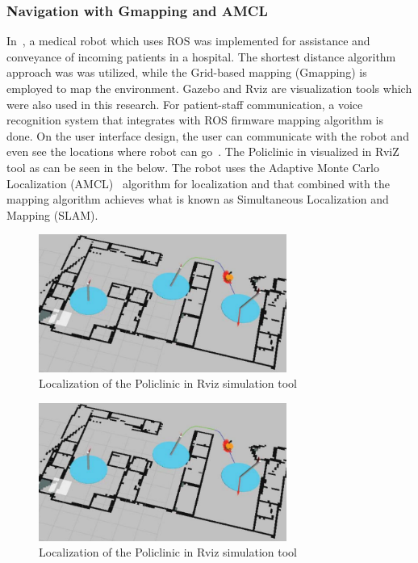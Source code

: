 \subsubsection{Navigation with Gmapping and AMCL}
\noindent In~\cite{kok2020intelligent}, a medical robot which uses ROS was implemented for assistance and conveyance of incoming patients in a hospital. The shortest distance algorithm approach
was was utilized, while the Grid-based mapping (Gmapping) is employed to map the environment. Gazebo and Rviz are visualization tools which were
also used in this research. For patient-staff communication, a voice recognition system that integrates with ROS firmware mapping algorithm is done. On the user interface design, the user
can communicate with the robot and even see the locations where robot can go~\cite{kok2020intelligent}. The Policlinic in visualized in
RviZ tool as can be seen in the  below. The robot uses the Adaptive Monte Carlo Localization (AMCL)~\cite{chung2022improved} algorithm for localization and that combined
with the mapping algorithm achieves what is known as Simultaneous Localization and Mapping (SLAM). 


\begin{figure}[H]
    \centering
    \includegraphics[width=3.2in]{pics/lt_1.png}
    \caption[Localization of the Policlinic in Rviz simulation tool]{Localization of the Policlinic in Rviz simulation tool~\cite{kok2020intelligent}}\label{lt_1}
\end{figure}

\begin{figure}[H]
    \centering
    \includegraphics[width=3.2in]{pics/lt_1.png}
    \caption[Localization of the Policlinic in Rviz simulation tool]{Localization of the Policlinic in Rviz simulation tool~\cite{kok2020intelligent}}\label{lt_1}
\end{figure}


